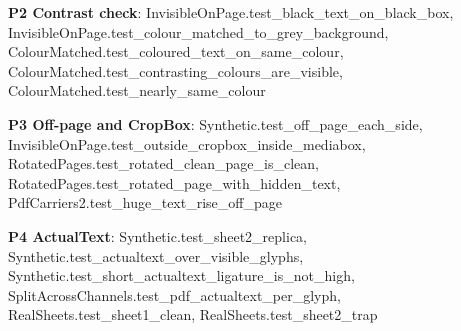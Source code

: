 \documentclass[10pt,a4paper]{article}
\begin{document}
\textbf{P2 Contrast check}: \textcolor{ok}{InvisibleOnPage.\allowbreak{}test\_\allowbreak{}black\_\allowbreak{}text\_\allowbreak{}on\_\allowbreak{}black\_\allowbreak{}box}, \textcolor{ok}{InvisibleOnPage.\allowbreak{}test\_\allowbreak{}colour\_\allowbreak{}matched\_\allowbreak{}to\_\allowbreak{}grey\_\allowbreak{}background}, \textcolor{ok}{ColourMatched.\allowbreak{}test\_\allowbreak{}coloured\_\allowbreak{}text\_\allowbreak{}on\_\allowbreak{}same\_\allowbreak{}colour}, \textcolor{ok}{ColourMatched.\allowbreak{}test\_\allowbreak{}contrasting\_\allowbreak{}colours\_\allowbreak{}are\_\allowbreak{}visible}, \textcolor{ok}{ColourMatched.\allowbreak{}test\_\allowbreak{}nearly\_\allowbreak{}same\_\allowbreak{}colour}\par
\textbf{P3 Off-page and CropBox}: \textcolor{ok}{Synthetic.\allowbreak{}test\_\allowbreak{}off\_\allowbreak{}page\_\allowbreak{}each\_\allowbreak{}side}, \textcolor{ok}{InvisibleOnPage.\allowbreak{}test\_\allowbreak{}outside\_\allowbreak{}cropbox\_\allowbreak{}inside\_\allowbreak{}mediabox}, \textcolor{ok}{RotatedPages.\allowbreak{}test\_\allowbreak{}rotated\_\allowbreak{}clean\_\allowbreak{}page\_\allowbreak{}is\_\allowbreak{}clean}, \textcolor{ok}{RotatedPages.\allowbreak{}test\_\allowbreak{}rotated\_\allowbreak{}page\_\allowbreak{}with\_\allowbreak{}hidden\_\allowbreak{}text}, \textcolor{ok}{PdfCarriers2.\allowbreak{}test\_\allowbreak{}huge\_\allowbreak{}text\_\allowbreak{}rise\_\allowbreak{}off\_\allowbreak{}page}\par
\textbf{P4 ActualText}: \textcolor{ok}{Synthetic.\allowbreak{}test\_\allowbreak{}sheet2\_\allowbreak{}replica}, \textcolor{ok}{Synthetic.\allowbreak{}test\_\allowbreak{}actualtext\_\allowbreak{}over\_\allowbreak{}visible\_\allowbreak{}glyphs}, \textcolor{ok}{Synthetic.\allowbreak{}test\_\allowbreak{}short\_\allowbreak{}actualtext\_\allowbreak{}ligature\_\allowbreak{}is\_\allowbreak{}not\_\allowbreak{}high}, \textcolor{ok}{SplitAcrossChannels.\allowbreak{}test\_\allowbreak{}pdf\_\allowbreak{}actualtext\_\allowbreak{}per\_\allowbreak{}glyph}, \textcolor{bad}{RealSheets.\allowbreak{}test\_\allowbreak{}sheet1\_\allowbreak{}clean}, \textcolor{bad}{RealSheets.\allowbreak{}test\_\allowbreak{}sheet2\_\allowbreak{}trap}\par
\end{document}
